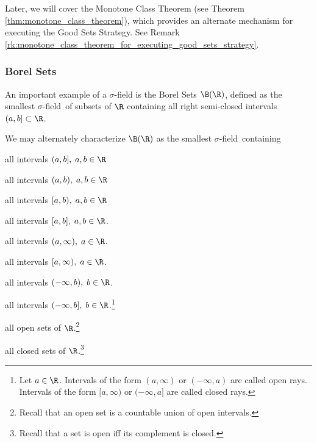 \documentclass{article} %
\renewcommand{\sf}{$\sigma$-field}
\begin{document}
\begin{remark} 
Later, we will cover the Monotone Class Theorem (see Theorem \ref{thm:monotone_class_theorem}), which provides an alternate mechanism for executing the Good Sets Strategy.  See Remark \ref{rk:monotone_class_theorem_for_executing_good_sets_strategy}.
\end{remark}

\subsubsection{Borel Sets} \label{sec:borel_sets}

An important example of a $\sigma$-field is the Borel Sets $\B(\R)$, defined as the smallest \sf\ of subsets of $\R$ containing all right semi-closed intervals $(a,b] \subset \R$.  

We may alternately characterize $\B(\R)$ as the smallest \sf\ containing
\begin{alphabate}
\item all intervals $(a,b], \; a,b \in \R$
\item all intervals $(a,b), \; a,b \in \R$
\item all intervals $[a,b), \; a,b \in \R$
\item all intervals $[a,b], \; a,b \in \R$.
\item all intervals $(a,\infty), \; a \in \R$.
\item  all intervals $[a,\infty), \; a \in \R$.
\item 	 all intervals $(-\infty,b), \; b \in \R$.
\item  all intervals $(-\infty,b], \; b \in \R$.\footnote{Let $a \in \R$. Intervals of the form $(a, \infty)$ or $(-\infty, a)$ are called open rays.  Intervals of the form $[a, \infty)$ or $(-\infty, a]$  are called closed rays.}
\item all open sets of $\R$.\footnote{Recall that an open set is a countable union of open intervals.}
\item all closed sets of $\R$.\footnote{Recall that a set is open iff its complement is closed.}
\end{alphabate}
\end{document}
